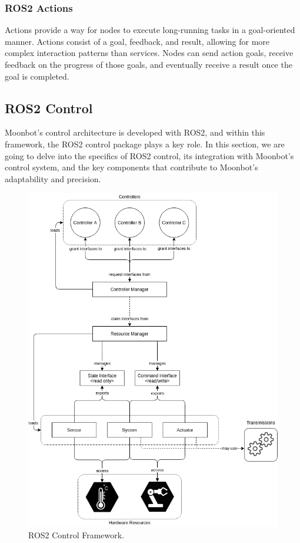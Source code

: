 \subsubsection{ROS2 Actions}
Actions provide a way for nodes to execute long-running tasks in a goal-oriented manner. Actions consist of a goal, feedback, and result, allowing for more complex interaction patterns than services. Nodes can send action goals, receive feedback on the progress of those goals, and eventually receive a result once the goal is completed.\\

\subsection{ROS2 Control}
Moonbot's control architecture is developed with ROS2, and within this framework, the ROS2 control package \cite{ros2control} plays a key role. In this section, we are going to delve into the specifics of ROS2 control, its integration with Moonbot's control system, and the key components that contribute to Moonbot's adaptability and precision.

\begin{figure}[ht]
  \centering
  \includegraphics[width=120mm]{./fig/ros2_control/components_architecture.png}
  \vspace{2mm}
  \caption{ROS2 Control Framework. \cite{ros2control}}\label{ros2_control_framework}
\end{figure}

